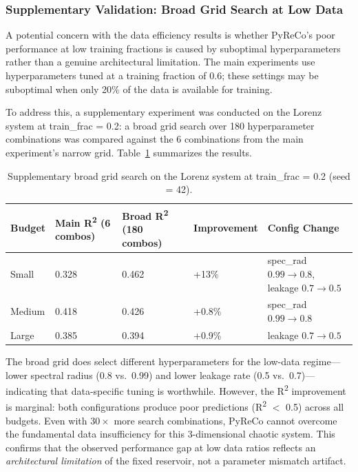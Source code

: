 \subsubsection{Supplementary Validation: Broad Grid Search at Low Data}

A potential concern with the data efficiency results is whether PyReCo's poor performance at low training fractions is caused by suboptimal hyperparameters rather than a genuine architectural limitation. The main experiments use hyperparameters tuned at a training fraction of 0.6; these settings may be suboptimal when only 20\% of the data is available for training.

To address this, a supplementary experiment was conducted on the Lorenz system at train\_frac = 0.2: a broad grid search over 180 hyperparameter combinations was compared against the 6 combinations from the main experiment's narrow grid. Table~\ref{tab:broad_grid} summarizes the results.

\begin{table}[H]
\centering
\caption{Supplementary broad grid search on the Lorenz system at train\_frac = 0.2 (seed = 42).}
\label{tab:broad_grid}
\small
\begin{tabular}{@{}llllp{4.2cm}@{}}
\toprule
Budget & Main R\textsuperscript{2} (6 combos) & Broad R\textsuperscript{2} (180 combos) & Improvement & Config Change \\
\midrule
Small  & 0.328 & 0.462 & +13\% & spec\_rad $0.99 \to 0.8$, leakage $0.7 \to 0.5$ \\
Medium & 0.418 & 0.426 & +0.8\% & spec\_rad $0.99 \to 0.8$ \\
Large  & 0.385 & 0.394 & +0.9\% & leakage $0.7 \to 0.5$ \\
\bottomrule
\end{tabular}
\end{table}

The broad grid does select different hyperparameters for the low-data regime---lower spectral radius (0.8 vs.\ 0.99) and lower leakage rate (0.5 vs.\ 0.7)---indicating that data-specific tuning is worthwhile. However, the R\textsuperscript{2} improvement is marginal: both configurations produce poor predictions (R\textsuperscript{2} $<$ 0.5) across all budgets. Even with $30\times$ more search combinations, PyReCo cannot overcome the fundamental data insufficiency for this 3-dimensional chaotic system. This confirms that the observed performance gap at low data ratios reflects an \emph{architectural limitation} of the fixed reservoir, not a parameter mismatch artifact.


